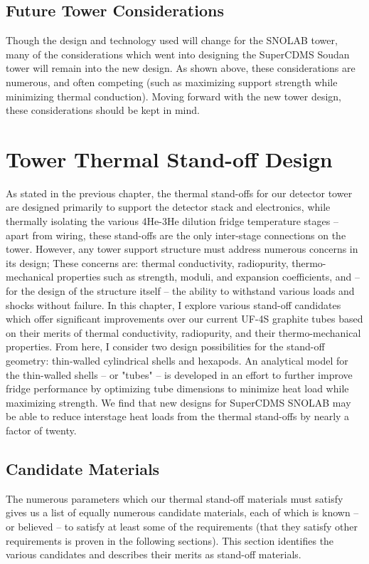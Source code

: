 \documentclass{report}
\begin{document}
\section{Future Tower Considerations}
Though the design and technology used will change for the SNOLAB tower, many of the considerations which went into designing the SuperCDMS Soudan tower will remain into the new design. As shown above, these considerations are numerous, and often competing (such as maximizing support strength while minimizing thermal conduction). Moving forward with the new tower design, these considerations should be kept in mind.


\chapter{Tower Thermal Stand-off Design}

As stated in the previous chapter, the thermal stand-offs for our detector tower are designed primarily to support the detector stack and electronics, while thermally isolating the various 4He-3He dilution fridge temperature stages -- apart from wiring, these stand-offs are the only inter-stage connections on the tower. However, any tower support structure must address numerous concerns in its design; These concerns are: thermal conductivity, radiopurity, thermo-mechanical properties such as strength, moduli, and expansion coefficients, and -- for the design of the structure itself -- the ability to withstand various loads and shocks without failure. In this chapter, I explore various stand-off candidates which offer significant improvements over our current UF-4S graphite tubes based on their merits of thermal conductivity, radiopurity, and their thermo-mechanical properties. From here, I consider two design possibilities for the stand-off geometry: thin-walled cylindrical shells and hexapods. An analytical model for the thin-walled shells -- or "tubes" -- is developed in an effort to further improve fridge performance by optimizing tube dimensions to minimize heat load while maximizing strength. We find that new designs for SuperCDMS SNOLAB may be able to reduce interstage heat loads from the thermal stand-offs by nearly a factor of twenty.

\section{Candidate Materials}
The numerous parameters which our thermal stand-off materials must satisfy gives us a list of equally numerous candidate materials, each of which is known -- or believed -- to satisfy at least some of the requirements (that they satisfy other requirements is proven in the following sections). This section identifies the various candidates and describes their merits as stand-off materials.
\end{document}
